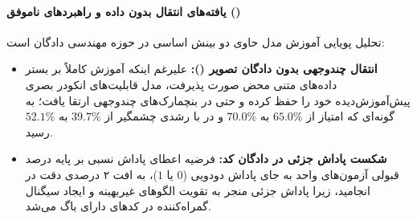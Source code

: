 \paragraph*{یافته‌های انتقال بدون داده و راهبردهای ناموفق ()}
تحلیل پویایی آموزش مدل حاوی دو بینش اساسی در حوزه مهندسی دادگان است:
\begin{itemize}
    \item \textbf{انتقال چندوجهی بدون دادگان تصویر ():} علیرغم اینکه آموزش  کاملاً بر بستر داده‌های متنی محض صورت پذیرفت، مدل قابلیت‌های انکودر بصری پیش‌آموزش‌دیده خود را حفظ کرده و حتی در بنچمارک‌های چندوجهی ارتقا یافت؛ به گونه‌ای که امتیاز  از $65.0\%$ به $70.0\%$ و در  با رشدی چشمگیر از $39.7\%$ به $52.1\%$ رسید.
    \item \textbf{شکست پاداش جزئی در دادگان کد:} فرضیه اعطای پاداش نسبی بر پایه درصد قبولی آزمون‌های واحد به جای پاداش دودویی ($0$ یا $1$)، به افت ۲ درصدی دقت در  انجامید، زیرا پاداش جزئی منجر به تقویت الگوهای غیربهینه و ایجاد سیگنال گمراه‌کننده در کدهای دارای باگ می‌شد.
\end{itemize}